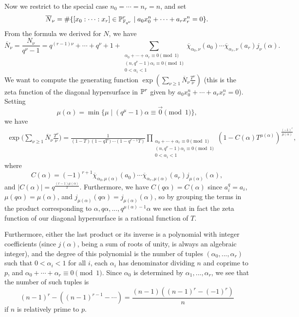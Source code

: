 \documentclass[letterpaper,11pt]{article}
\begin{document}
Now we restrict to the special case $n_0 = \cdots = n_r = n$, and set
\[
\overline{N}_\nu = \#\{[x_0:\cdots :x_r]\in\mathbb{P}_{\mathbb{F}_{q^\nu}}^r \mid a_0x_0^n + \cdots + a_rx_r^n = 0\}.
\]
From the formula we derived for $N$, we have
\[
\overline{N}_\nu = \frac{N_\nu}{q^\nu-1} = q^{(r-1)\nu} + \cdots + q^\nu + 1 + \sum_{\substack{\alpha_0+\cdots+\alpha_r \equiv 0 \pmod{1}\\(n,q^{\nu}-1)\alpha_i \equiv 0 \pmod{1}\\0 < \alpha_i < 1}} \overline{\chi}_{\alpha_0,\nu}(a_0)\cdots\overline{\chi}_{\alpha_r,\nu}(a_r)j_\nu(\alpha).
\]
We want to compute the generating function $\exp(\sum_{\nu\ge 1} \overline{N}_\nu \frac{T^\nu}{\nu})$ (this is the zeta function of the diagonal hypersurface in $\mathbb{P}^r$ given by $a_0x_0^n + \cdots + a_rx_r^n = 0$). Setting
\[
\mu(\alpha) = \min \{\mu \mid (q^\mu - 1)\alpha \equiv \vec{0} \pmod{1}\},
\]
we have
\begin{align*}
\exp\bigg(\sum_{\nu\ge 1} \overline{N}_\nu \frac{T^\nu}{\nu}\bigg) = \frac{1}{(1-T)(1-qT)\cdots (1-q^{r-1}T)}\prod_{\substack{\alpha_0+\cdots+\alpha_r \equiv 0 \pmod{1}\\(n,q^{\nu}-1)\alpha_i \equiv 0 \pmod{1}\\0 < \alpha_i < 1}}(1-C(\alpha)T^{\mu(\alpha)})^{\frac{(-1)^r}{\mu(\alpha)}},
\end{align*}
where
\[
C(\alpha) = (-1)^{r+1}\overline{\chi}_{\alpha_0,\mu(\alpha)}(a_0)\cdots\overline{\chi}_{\alpha_r,\mu(\alpha)}(a_r)j_{\mu(\alpha)}(\alpha),
\]
and $|C(\alpha)| = q^{\frac{(r-1)\mu(\alpha)}{2}}$. Furthermore, we have $C(q\alpha) = C(\alpha)$ since $a_i^q = a_i$, $\mu(q\alpha) = \mu(\alpha)$, and $j_{\mu(\alpha)}(q\alpha) = j_{\mu(\alpha)}(\alpha)$, so by grouping the terms in the product corresponding to $\alpha, q\alpha, ..., q^{\mu(\alpha)-1}\alpha$ we see that in fact the zeta function of our diagonal hypersurface is a rational function of $T$.

Furthermore, either the last product or its inverse is a polynomial with integer coefficients (since $j(\alpha)$, being a sum of roots of unity, is always an algebraic integer), and the degree of this polynomial is the number of tuples $(\alpha_0, ..., \alpha_r)$ such that $0 < \alpha_i < 1$ for all $i$, each $\alpha_i$ has denominator dividing $n$ and coprime to $p$, and $\alpha_0 + \cdots + \alpha_r \equiv 0 \pmod{1}$. Since $\alpha_0$ is determined by $\alpha_1, ..., \alpha_r$, we see that the number of such tuples is
\[
(n-1)^r - ((n-1)^{r-1} - \cdots) = \frac{(n-1)((n-1)^r-(-1)^r)}{n}
\]
if $n$ is relatively prime to $p$.
\end{document}
